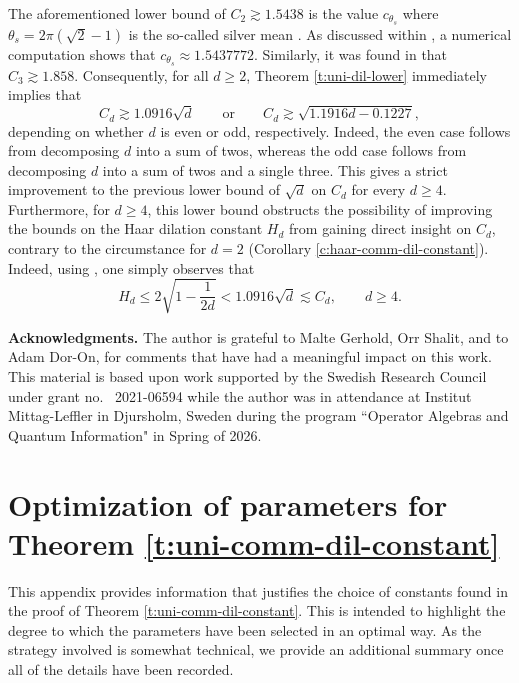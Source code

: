 \documentclass[10pt]{amsart}
\begin{document}
The aforementioned lower bound of $C_2 \gtrsim 1.5438$ is the value $c_{\theta_s}$ where $\theta_s= 2\pi(\sqrt{2}-1)$ is the so-called silver mean \cite[Example 7.3]{gerhold2022dilations}. As discussed within \cite{gerhold2022dilations}, a numerical computation shows that $c_{\theta_s}\approx 1.5437772$. Similarly, it was found in \cite[Corollary 4.7]{gerhold2021dilations} that $C_3\gtrsim 1.858$. Consequently, for all $d\geq 2$, Theorem \ref{t:uni-dil-lower} immediately implies that
\[
    C_d \gtrsim 1.0916\sqrt{d} \qquad \text{or} \qquad C_d \gtrsim \sqrt{1.1916d - 0.1227},
\]
depending on whether $d$ is even or odd, respectively. Indeed, the even case follows from decomposing $d$ into a sum of twos, whereas the odd case follows from decomposing $d$ into a sum of twos and a single three. This gives a strict improvement to the previous lower bound of $\sqrt{d}$ on $C_d$ for every $d\geq4$. Furthermore, for $d\geq 4$, this lower bound obstructs the possibility of improving the bounds on the Haar dilation constant $H_d$ from gaining direct insight on $C_d$, contrary to the circumstance for $d=2$ (Corollary \ref{c:haar-comm-dil-constant}). Indeed, using \cite[Theorem 3.10]{gerhold2021dilations}, one simply observes that
\[
    H_d \leq 2\sqrt{1-\frac{1}{2d}} < 1.0916\sqrt{d} \lesssim C_d, \qquad d\geq 4.
\]


\vspace{6pt}
\textbf{Acknowledgments.}
The author is grateful to Malte Gerhold, Orr Shalit, and to Adam Dor-On, for comments that have had a meaningful impact on this work. This material is based upon work supported by the Swedish Research Council under grant no.~ 2021-06594 while the author was in attendance at Institut Mittag-Leffler in Djursholm, Sweden during the program ``Operator Algebras and Quantum Information" in Spring of 2026.


\appendix
\section{Optimization of parameters for Theorem \ref{t:uni-comm-dil-constant}}\label{s:optimization}

This appendix provides information that justifies the choice of constants found in the proof of Theorem \ref{t:uni-comm-dil-constant}. This is intended to highlight the degree to which the parameters have been selected in an optimal way. As the strategy involved is somewhat technical, we provide an additional summary once all of the details have been recorded.
\end{document}
